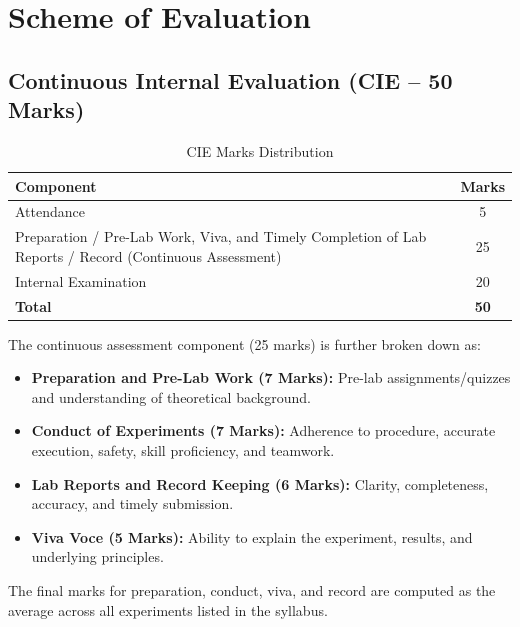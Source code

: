 \section*{Scheme of Evaluation}

\subsection*{Continuous Internal Evaluation (CIE -- 50 Marks)}
\begin{table}[H]
	\centering
	\renewcommand{\arraystretch}{1.3}
	\begin{tabular}{p{8cm}c}
		\toprule
		\textbf{Component} & \textbf{Marks} \\
		\midrule
		Attendance & 5 \\
		
		Preparation / Pre-Lab Work, Viva, and Timely Completion of Lab Reports / Record (Continuous Assessment) & 25 \\
		
		Internal Examination & 20 \\
		
		\textbf{Total} & \textbf{50} \\
		\bottomrule
	\end{tabular}
	\caption{CIE Marks Distribution}
\end{table}

The continuous assessment component (25 marks) is further broken down as:
\begin{itemize}[label=]
	\item \textbf{Preparation and Pre-Lab Work (7 Marks):} Pre-lab assignments/quizzes and understanding of theoretical background.
	\item \textbf{Conduct of Experiments (7 Marks):} Adherence to procedure, accurate execution, safety, skill proficiency, and teamwork.
	\item \textbf{Lab Reports and Record Keeping (6 Marks):} Clarity, completeness, accuracy, and timely submission.
	\item \textbf{Viva Voce (5 Marks):} Ability to explain the experiment, results, and underlying principles.
\end{itemize}
The final marks for preparation, conduct, viva, and record are computed as the average across all experiments listed in the syllabus.

